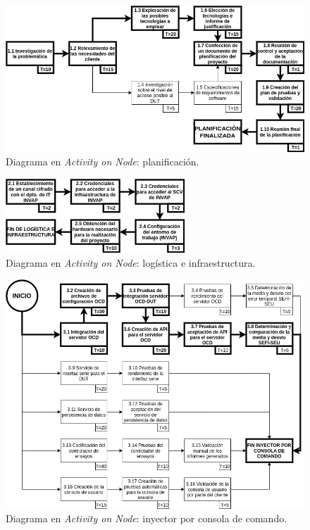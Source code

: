 \documentclass[
11pt, %
]{charter}
\begin{document}
\begin{figure}[htpb]
	\centering 
	\includegraphics[width=\textwidth]{./Figuras/AoN1.png}
	\caption{Diagrama en \textit{Activity on Node}: planificación.}
	\label{fig:AoN1}
\end{figure}

\begin{figure}[htpb]
	\centering 
	\includegraphics[width=0.6\textwidth]{./Figuras/AoN2.png}
	\caption{Diagrama en \textit{Activity on Node}: logística e infraestructura.}
	\label{fig:AoN2}
\end{figure}

\begin{figure}[htpb]
	\centering 
	\includegraphics[width=\textwidth]{./Figuras/AoN3.png}
	\caption{Diagrama en \textit{Activity on Node}: inyector por consola de comando.}
	\label{fig:AoN3}
\end{figure}
\end{document}
